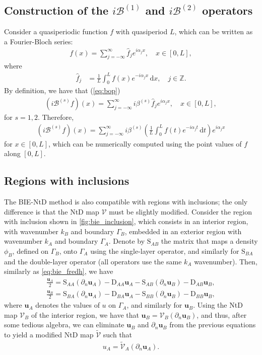 \documentclass[reprint,amsmath,amssymb,
 aps]{revtex4-2}
\newcommand{\bol}{\boldsymbol}
\newcommand{\de}{\,\mathrm{d}}
\newcommand{\Z}{\mathbb{Z}}
\newcommand{\Bcal}{\mathcal{B}}
\newcommand{\Vcal}{\mathcal{V}}
\begin{document}
\subsection{Construction of the $i\Bcal^{(1)}$ and $i\Bcal^{(2)}$ operators}\label{sec:bop}
Consider a quasiperiodic function $f$ with quasiperiod $L$, which can be written as a Fourier-Bloch series:
\begin{align}
    f(x) = \sum\limits_{j=-\infty}^\infty \hat{f}_je^{i\alpha_jx}, \quad x \in [0,L],
\end{align}
where 
\begin{align}
    \hat{f}_j &= \frac{1}{L}\int_0^L f(x)e^{-i\alpha_jx}\de x, \quad j\in\Z.
\end{align}
By definition, we have that (\cref{eq:bop})
\begin{align}
    (i\Bcal^{(s)}f)(x) = \sum\limits_{j=-\infty}^\infty i\beta^{(s)}\hat{f}_je^{i\alpha_jx}, \quad x \in [0,L],
\end{align}
for $s = 1,2$. Therefore,
\begin{align}
    (i\Bcal^{(s)}f)(x) = \sum\limits_{j=-\infty}^\infty i\beta^{(s)}\left(\frac{1}{L}\int_0^L f(t)e^{-i\alpha_jt}\de t\right)e^{i\alpha_jx}
\end{align}
for $x \in [0,L]$, which can be numerically computed using the point values of $f$ along $[0,L]$.

\subsection{Regions with inclusions}
The BIE-NtD method is also compatible with regions with inclusions; the only difference is that the NtD map $\Vcal$ must be slightly modified. Consider the region with inclusion shown in \cref{fig:bie_inclusion}, which consists in an interior region, with wavenumber $k_B$ and boundary $\Gamma_B$, embedded in an exterior region with wavenumber $k_A$ and boundary $\Gamma_A$. Denote by $\mathrm{S}_{AB}$ the matrix that maps a density $\phi_B$, defined on $\Gamma_B$, onto $\Gamma_A$ using the single-layer operator, and similarly for $\mathrm{S}_{BA}$ and the double-layer operator (all operators use the same $k_A$ wavenumber). Then, similarly as \cref{eq:bie_fredh}, we have
\begin{align}
    \frac{\bol u_A}{2} = \mathrm{S}_{AA}(\partial_n \bol u_A) - \mathrm{D}_{AA}\bol u_A - \mathrm{S}_{AB}(\partial_n \bol u_B) - \mathrm{D}_{AB}\bol u_B,\\
    \frac{\bol u_B}{2} = \mathrm{S}_{BA}(\partial_n \bol u_A) - \mathrm{D}_{BA}\bol u_A - \mathrm{S}_{BB}(\partial_n \bol u_B) - \mathrm{D}_{BB}\bol u_B,
\end{align}
where $\bol u_A$ denotes the values of $u$ on $\Gamma_A$, and similarly for $\bol u_B$. Using the NtD map $\Vcal_B$ of the interior region, we have that $\bol u_B=\Vcal_B(\partial_n \bol u_B)$, and thus, after some tedious algebra, we can eliminate $\bol u_B$ and $\partial_n \bol u_B$ from the previous equations to yield a modified NtD map $\tilde{\Vcal}$ such that
\begin{align}
    u_A=\tilde{\Vcal}_A(\partial_n \bol u_A).
\end{align}
\end{document}
